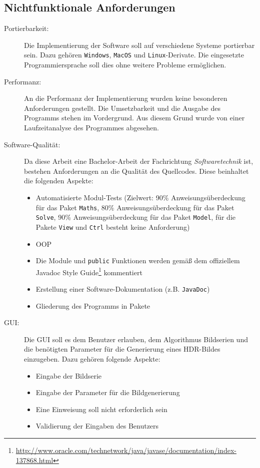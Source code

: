 \subsection{Nichtfunktionale Anforderungen}
\label{nfa}
\begin{description}
    \item[Portierbarkeit:] Die Implementierung der Software soll auf verschiedene Systeme portierbar sein. Dazu gehören \texttt{Windows}, \texttt{MacOS} und \texttt{Linux}-Derivate. Die eingesetzte Programmiersprache soll dies ohne weitere Probleme ermöglichen.
    
    \item[Performanz:] An die Performanz der Implementierung wurden keine besonderen Anforderungen gestellt. Die Umsetzbarkeit und die Ausgabe des Programms stehen im Vordergrund. Aus diesem Grund wurde von einer Laufzeitanalyse des Programmes abgesehen.
    
    \item[Software-Qualität:] Da diese Arbeit eine Bachelor-Arbeit der Fachrichtung \textit{Softwaretechnik} ist, bestehen Anforderungen an die Qualität des Quellcodes. Diese beinhaltet die folgenden Aspekte:
    \begin{itemize}
        \item Automatisierte Modul-Tests (Zielwert: 90\% Anweisungsüberdeckung für das Paket \texttt{Maths}, 80\% Anweisungsüberdeckung für das Paket \texttt{Solve}, 90\% Anweisungsüberdeckung für das Paket \texttt{Model}, für die Pakete \texttt{View} und \texttt{Ctrl} besteht keine Anforderung)
        \item \gls{OOP}
        \item Die Module und \texttt{public} Funktionen werden gemäß dem offiziellem Javadoc Style Guide\footnote{\url{http://www.oracle.com/technetwork/java/javase/documentation/index-137868.html}} kommentiert
        \item Erstellung einer Software-Dokumentation (z.B. \texttt{JavaDoc})
        \item Gliederung des Programms in Pakete
    \end{itemize}
    \item[\Gls{GUI}:] Die \gls{GUI} soll es dem Benutzer erlauben, dem Algorithmus Bildserien und die benötigten Parameter für die Generierung eines \gls{HDR}-Bildes einzugeben. Dazu gehören folgende Aspekte:
    \begin{itemize}
        \item Eingabe der Bildserie
        \item Eingabe der Parameter für die Bildgenerierung
        \item Eine Einweisung soll nicht erforderlich sein
        \item Validierung der Eingaben des Benutzers
    \end{itemize}


\end{description}
